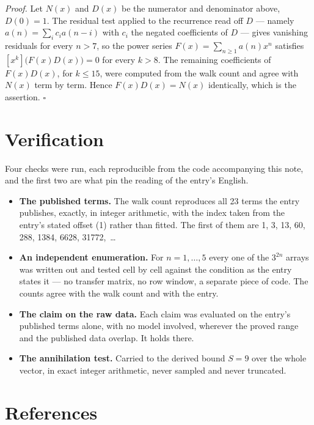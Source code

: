 \documentclass[11pt]{article}
\theoremstyle{definition}
\begin{document}
{\itshape Proof.} Let $N(x)$ and $D(x)$ be the numerator and denominator above, $D(0)=1$. The residual test applied to the recurrence read off $D$ --- namely $a(n) = \sum_i c_i a(n-i)$ with $c_i$ the negated coefficients of $D$ --- gives vanishing residuals for every $n > 7$, so the power series $F(x)=\sum_{n\ge 1}a(n)x^n$ satisfies $[x^k]\bigl(F(x)D(x)\bigr) = 0$ for every $k > 8$. The remaining coefficients of $F(x)D(x)$, for $k \le 15$, were computed from the walk count and agree with $N(x)$ term by term. Hence $F(x)D(x) = N(x)$ identically, which is the assertion. $\square$

\section{Verification}

Four checks were run, each reproducible from the code accompanying this note, and the first two are what pin the reading of the entry's English.

\begin{itemize}

\item {\bfseries The published terms.} The walk count reproduces all 23 terms the entry publishes, exactly, in integer arithmetic, with the index taken from the entry's stated offset (1) rather than fitted. The first of them are 1, 3, 13, 60, 288, 1384, 6628, 31772,~\dots

\item {\bfseries An independent enumeration.} For $n = 1,\dots,5$ every one of the $3^{2n}$ arrays was written out and tested cell by cell against the condition as the entry states it --- no transfer matrix, no row window, a separate piece of code. The counts agree with the walk count and with the entry.

\item {\bfseries The claim on the raw data.} Each claim was evaluated on the entry's published terms alone, with no model involved, wherever the proved range and the published data overlap. It holds there.

\item {\bfseries The annihilation test.} Carried to the derived bound $S = 9$ over the whole vector, in exact integer arithmetic, never sampled and never truncated.

\end{itemize}

\section{References}
\end{document}
